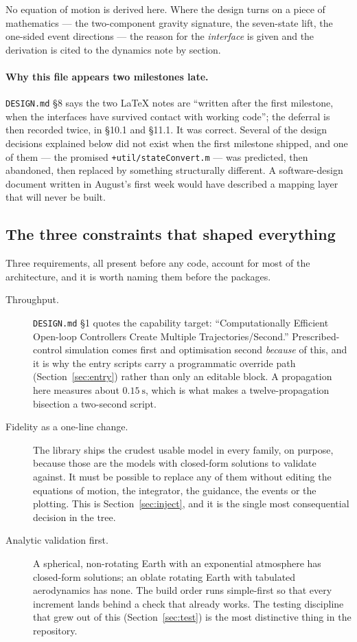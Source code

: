 \documentclass[11pt]{article}
\newcommand{\code}[1]{\texttt{#1}}
\begin{document}
No equation of motion is derived here. Where the design turns on a piece of
mathematics --- the two-component gravity signature, the seven-state lift, the
one-sided event directions --- the reason for the \emph{interface} is given and
the derivation is cited to the dynamics note by section.

\paragraph{Why this file appears two milestones late.} \code{DESIGN.md} \S8
says the two \LaTeX{} notes are ``written after the first milestone, when the
interfaces have survived contact with working code''; the deferral is then
recorded twice, in \S10.1 and \S11.1. It was correct. Several of the design
decisions explained below did not exist when the first milestone shipped, and
one of them --- the promised \code{+util/stateConvert.m} --- was predicted,
then abandoned, then replaced by something structurally different. A
software-design document written in August's first week would have described a
mapping layer that will never be built.

\subsection{The three constraints that shaped everything}

Three requirements, all present before any code, account for most of the
architecture, and it is worth naming them before the packages.

\begin{description}
\item[Throughput.] \code{DESIGN.md} \S1 quotes the capability target:
``Computationally Efficient Open-loop Controllers Create Multiple
Trajectories/Second.'' Prescribed-control simulation comes first and
optimisation second \emph{because} of this, and it is why the entry scripts
carry a programmatic override path (Section~\ref{sec:entry}) rather than only
an editable block. A propagation here measures about $0.15~\mathrm{s}$, which
is what makes a twelve-propagation bisection a two-second script.

\item[Fidelity as a one-line change.] The library ships the crudest usable
model in every family, on purpose, because those are the models with closed-form
solutions to validate against. It must be possible to replace any of them
without editing the equations of motion, the integrator, the guidance, the
events or the plotting. This is Section~\ref{sec:inject}, and it is the single
most consequential decision in the tree.

\item[Analytic validation first.] A spherical, non-rotating Earth with an
exponential atmosphere has closed-form solutions; an oblate rotating Earth with
tabulated aerodynamics has none. The build order runs simple-first so that
every increment lands behind a check that already works. The testing discipline
that grew out of this (Section~\ref{sec:test}) is the most distinctive thing in
the repository.
\end{description}
\end{document}
